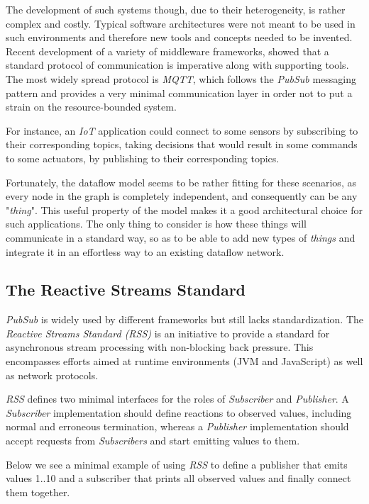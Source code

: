 \documentclass[sigplan,review,anonymous]{acmart}
\begin{document}
The development of such systems though, due to their heterogeneity, is rather
complex and costly. Typical software architectures were not meant to be used in
such environments and therefore new tools and concepts needed to be invented.
Recent development of a variety of middleware frameworks, showed that a standard
protocol of communication is imperative along with supporting
tools\cite{iot_middleware}. The most widely spread protocol is \textit{MQTT},
which follows the \textit{PubSub} messaging pattern and provides a very minimal
communication layer in order not to put a strain on the resource-bounded
system\cite{mqtt}.

For instance, an \textit{IoT} application could connect to some sensors by
subscribing to their corresponding topics, taking decisions that would result in
some commands to some actuators, by publishing to their corresponding topics.

Fortunately, the dataflow model seems to be rather fitting for these
scenarios\cite{iot_dataflow}, as every node in the graph is completely
independent, and consequently can be any "\textit{thing}". This useful property
of the model makes it a good architectural choice for such applications. The
only thing to consider is how these things will communicate in a standard way,
so as to be able to add new types of \textit{things} and integrate it in an
effortless way to an existing dataflow network.

\subsection{The Reactive Streams Standard}

\textit{PubSub} is widely used by different frameworks but still lacks
standardization. The \textit{Reactive Streams Standard (RSS)} is an initiative
to provide a standard for asynchronous stream processing with non-blocking back
pressure. This encompasses efforts aimed at runtime environments (JVM and
JavaScript) as well as network protocols\cite{rss}.

\textit{RSS} defines two minimal interfaces for the roles of \textit{Subscriber}
and \textit{Publisher}.
A \textit{Subscriber} implementation should define
reactions to observed values, including normal and erroneous termination,
whereas a \textit{Publisher} implementation should accept requests from
\textit{Subscribers} and start emitting values to them.

Below we see a minimal example of using \textit{RSS} to define a publisher that
emits values 1..10 and a subscriber that prints all observed values and finally
connect them together.
\end{document}
